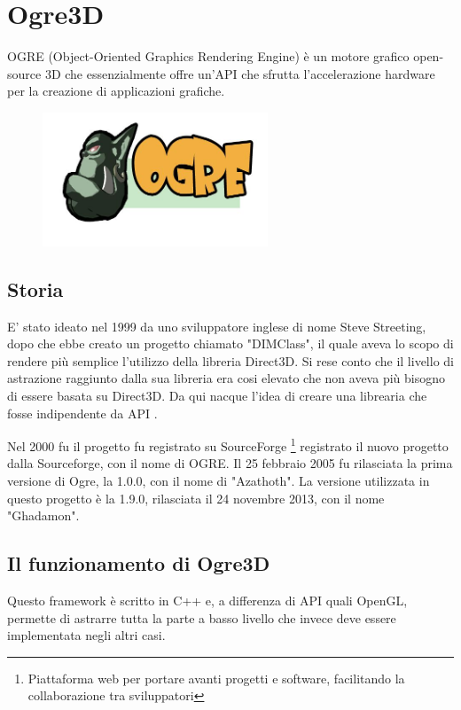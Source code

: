 
\section{Ogre3D}
OGRE (Object-Oriented Graphics Rendering Engine) è un motore grafico open-source 3D che essenzialmente offre un'API che sfrutta l'accelerazione hardware per la creazione di applicazioni grafiche. \\

\begin{figure}
\centering
\includegraphics[width=0.6\textwidth]{images/ogre/ogrelogo-small.jpg}

\end{figure}

\subsection{Storia}
E' stato ideato nel 1999 da uno sviluppatore inglese di nome Steve Streeting, dopo che ebbe creato un progetto chiamato "DIMClass", il quale aveva lo scopo di rendere più semplice l'utilizzo della libreria Direct3D. Si rese conto che il livello di astrazione raggiunto dalla sua libreria era cosi elevato che non aveva più bisogno di essere basata su Direct3D. Da qui nacque l'idea di creare una librearia che fosse indipendente da API \cite{ogre-wiki}.

Nel 2000 fu il progetto fu registrato su SourceForge \footnote{ Piattaforma web per portare avanti progetti e software, facilitando la collaborazione tra sviluppatori } registrato il nuovo progetto dalla Sourceforge, con il nome di OGRE. Il 25 febbraio 2005 fu rilasciata la  prima versione di Ogre, la 1.0.0, con il nome di "Azathoth". La versione utilizzata in questo progetto è la 1.9.0, rilasciata il 24 novembre 2013, con il nome "Ghadamon".

\subsection{Il funzionamento di Ogre3D}
Questo framework è scritto in C++ e, a differenza di API quali OpenGL, permette di astrarre tutta la parte a basso livello che invece deve essere implementata negli altri casi.

